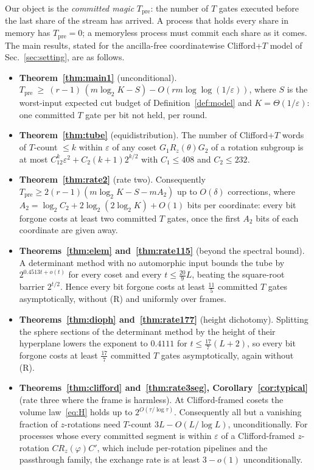 \documentclass[aps,prx,twocolumn,superscriptaddress,nofootinbib,longbibliography]{revtex4-2}
\theoremstyle{plain}
\theoremstyle{definition}
\theoremstyle{remark}
\newcommand{\Tpre}{T_{\mathrm{pre}}}
\begin{document}
Our object is the \emph{committed magic} $\Tpre$: the number of $T$ gates executed before the last share of the stream has arrived. A process that holds every share in memory has $\Tpre=0$; a memoryless process must commit each share as it comes. The main results, stated for the ancilla-free coordinatewise Clifford+$T$ model of Sec.~\ref{sec:setting}, are as follows.
\begin{itemize}\setlength\itemsep{1pt}
\item \textbf{Theorem~\ref{thm:main1}} (unconditional). $\Tpre\ \ge\ (r-1)\,(m\log_2K-S)-O(rm\log\log(1/\varepsilon))$, where $S$ is the worst-input expected cut budget of Definition~\ref{def:model} and $K=\Theta(1/\varepsilon)$: one committed $T$ gate per bit not held, per round.
\item \textbf{Theorem~\ref{thm:tube}} (equidistribution). The number of Clifford+$T$ words of $T$-count $\le k$ within $\varepsilon$ of any coset $G_1R_z(\theta)G_2$ of a rotation subgroup is at most $C_12^k\varepsilon^2+C_2(k+1)2^{k/2}$ with $C_1\le408$ and $C_2\le232$.
\item \textbf{Theorem~\ref{thm:rate2}} (rate two). Consequently $\Tpre\ge2(r-1)(m\log_2K-S-mA_2)$ up to $O(\delta)$ corrections, where $A_2=\log_2C_2+2\log_2(2\log_2K)+O(1)$ bits per coordinate: every bit forgone costs at least two committed $T$ gates, once the first $A_2$ bits of each coordinate are given away.
\item \textbf{Theorems~\ref{thm:elem} and~\ref{thm:rate115}} (beyond the spectral bound). A determinant method with no automorphic input bounds the tube by $2^{0.4513t+o(t)}$ for every coset and every $t\le\tfrac{20}9L$, beating the square-root barrier $2^{t/2}$. Hence every bit forgone costs at least $\tfrac{11}5$ committed $T$ gates asymptotically, without (R) and uniformly over frames.
\item \textbf{Theorems~\ref{thm:dioph} and~\ref{thm:rate177}} (height dichotomy). Splitting the sphere sections of the determinant method by the height of their hyperplane lowers the exponent to $0.4111$ for $t\le\tfrac{17}7(L+2)$, so every bit forgone costs at least $\tfrac{17}7$ committed $T$ gates asymptotically, again without (R).
\item \textbf{Theorems~\ref{thm:clifford} and~\ref{thm:rate3seg}, Corollary~\ref{cor:typical}} (rate three where the frame is harmless). At Clifford-framed cosets the volume law~\eqref{eq:H} holds up to $2^{O(\tau/\log\tau)}$. Consequently all but a vanishing fraction of $z$-rotations need $T$-count $3L-O(L/\log L)$, unconditionally. For processes whose every committed segment is within $\varepsilon$ of a Clifford-framed $z$-rotation $CR_z(\varphi)C'$, which include per-rotation pipelines and the passthrough family, the exchange rate is at least $3-o(1)$ unconditionally.

\end{itemize}
\end{document}
